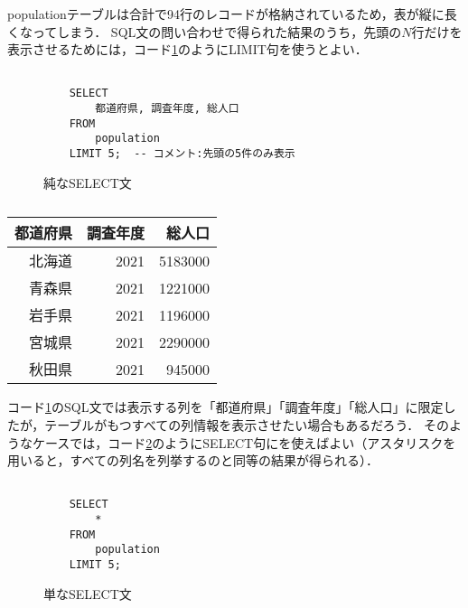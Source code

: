 populationテーブルは合計で94行のレコードが格納されているため，表が縦に長くなってしまう．
SQL文の問い合わせで得られた結果のうち，先頭の$N$行だけを表示させるためには，コード\ref{code:sql-select2}のようにLIMIT句を使うとよい．
\begin{figure}[tb]
    \begin{verbatim}

    SELECT
        都道府県, 調査年度, 総人口
    FROM
        population
    LIMIT 5;  -- コメント:先頭の5件のみ表示
    \end{verbatim}
    \captionsetup{name=コード}
    \caption{純なSELECT文}
    \label{code:sql-select2}
\end{figure}
\begin{table}[tb]
    \centering
    \begin{tabular}{rrr}
    \toprule
    \textbf{都道府県} & \textbf{調査年度} & \textbf{総人口} \\ \midrule
    北海道           & 2021          & 5183000      \\
    青森県           & 2021          & 1221000      \\
    岩手県           & 2021          & 1196000      \\
    宮城県           & 2021          & 2290000      \\
    秋田県           & 2021          & 945000       \\ \bottomrule
    \end{tabular}
    \caption{}
    \label{tb:}
\end{table}
コード\ref{code:sql-select2}のSQL文では表示する列を「都道府県」「調査年度」「総人口」に限定したが，テーブルがもつすべての列情報を表示させたい場合もあるだろう．
そのようなケースでは，コード\ref{code:sql-select3}のようにSELECT句にを使えばよい（アスタリスクを用いると，すべての列名を列挙するのと同等の結果が得られる）．
\begin{figure}[tb]
    \begin{verbatim}

    SELECT
        *
    FROM
        population
    LIMIT 5;
    \end{verbatim}
    \captionsetup{name=コード}
    \caption{単なSELECT文}
    \label{code:sql-select3}
\end{figure}
